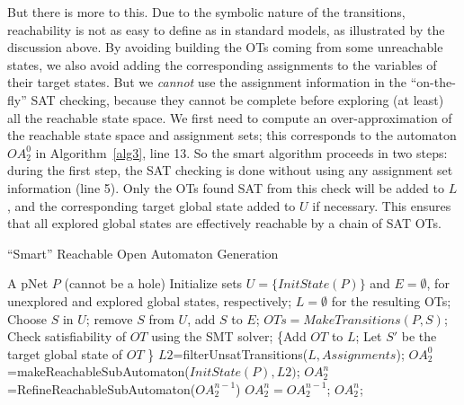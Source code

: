 \documentclass[smallcondensed]{svjour3}
\begin{document}
But there is more to this. Due to the symbolic nature of the
  transitions, reachability is not as easy to define as in standard
  models, as illustrated by the discussion above. By avoiding building
  the OTs coming from some unreachable states, we also avoid adding
  the corresponding assignments to the variables of their target states.
But we \emph{cannot} use the
assignment information in the ``on-the-fly'' SAT checking, because
they cannot be complete before exploring (at least) all the reachable
state space. We first need to compute an over-approximation of
the reachable state space and assignment sets; this corresponds to
the automaton $OA_2^0$ in Algorithm~\ref{alg3}, line 13.
So the smart algorithm proceeds in two steps: during the
first step, the SAT checking is done without using any assignment set
information (line 5).  Only the OTs found SAT from this check will be added
to $L$, and the corresponding target global state added to $U$ if
necessary. This ensures that all explored global states are
effectively reachable by a chain of SAT OTs.
 
\begin{algorithm}[h]
  \caption{``Smart'' Reachable Open Automaton Generation}
  \label{alg3}
\begin{algorithmic}[1]
\Require A pNet $P$ (cannot be a hole)
\State Initialize sets $U=\{\mathit{InitState}(P)\}$ and $E=\emptyset$,
for unexplored and explored global states, respectively; $L=\emptyset$ for the resulting OTs;
	\State Choose $S$ in $U$; remove $S$ from $U$, add $S$ to $E$;
	\State $\mathit{OTs} = \mathit{MakeTransitions}(P, S)$;
        Check satisfiability of $\mathit{OT}$ using the SMT solver;
                {\State \{Add $\mathit{OT}$ to $L$;
                  \State Let $S'$ be the target global state of $\mathit{OT}$
                  \}}
	\EndFor
\EndWhile
\State $\mathit{L2}$=filterUnsatTransitions($\mathit{L,Assignments}$);
\State $\mathit{OA_2^0}$=makeReachableSubAutomaton($\mathit{InitState}(P),L2)$;
\Repeat $\mathit{OA_2^n}$=RefineReachableSubAutomaton($\mathit{OA_2^{n-1}}$)
\Until  $\mathit{OA_2^n}=\mathit{OA_2^{n-1}}$;
\State \Return $\mathit{OA_2^n}$;
\end{algorithmic}  
\end{algorithm}
\end{document}
